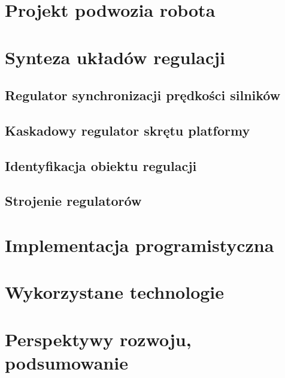 \documentclass{article}
\begin{document}
\section{Projekt podwozia robota}

\section{Synteza układów regulacji}
\subsection{Regulator synchronizacji prędkości silników}
\subsection{Kaskadowy regulator skrętu platformy}
\subsection{Identyfikacja obiektu regulacji}
\subsection{Strojenie regulatorów}

\section{Implementacja programistyczna}

\section{Wykorzystane technologie}

\section{Perspektywy rozwoju, podsumowanie}


\end{document}
